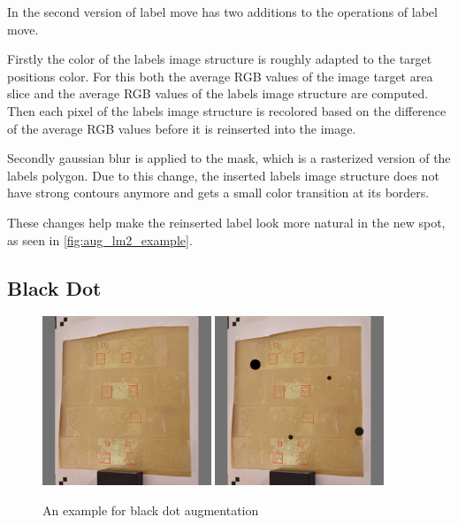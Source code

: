\documentclass[10pt]{book}
\begin{document}
In the second version of label move has two additions to the operations of label move. 

Firstly the color of the labels image structure is roughly adapted to the target positions color. For this both the average RGB values of the image target area slice and the average RGB values of the labels image structure are computed. Then each pixel of the labels image structure is recolored based on the difference of the average RGB values before it is reinserted into the image.

Secondly gaussian blur is applied to the mask, which is a rasterized version of the labels polygon. Due to this change, the inserted labels image structure does not have strong contours anymore and gets a small color transition at its borders.

These changes help make the reinserted label look more natural in the new spot, as seen in \autoref{fig:aug_lm2_example}.

\subsection{Black Dot}

\begin{figure}
  \centering
     {\includegraphics[width=0.45\textwidth]{image/aug_bd_before}}
     {\includegraphics[width=0.45\textwidth]{image/aug_bd_after}}
  \caption{An example for black dot augmentation}
  \label{fig:aug_bd_example}
\end{figure}
\end{document}
